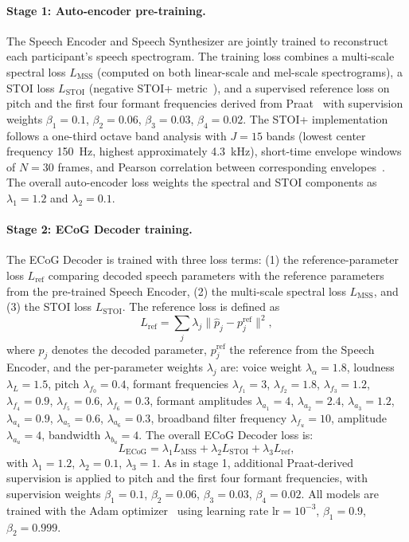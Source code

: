 \documentclass[10pt]{article}
\begin{document}
\paragraph{Stage 1: Auto-encoder pre-training.}
The Speech Encoder and Speech Synthesizer are jointly trained to reconstruct each participant's speech spectrogram. The training loss combines a multi-scale spectral loss $L_{\mathrm{MSS}}$ (computed on both linear-scale and mel-scale spectrograms), a STOI loss $L_{\mathrm{STOI}}$ (negative STOI+ metric~\cite{taal2011algorithm}), and a supervised reference loss on pitch and the first four formant frequencies derived from Praat~\cite{boersma2001praat} with supervision weights $\beta_1=0.1$, $\beta_2=0.06$, $\beta_3=0.03$, $\beta_4=0.02$. The STOI+ implementation follows a one-third octave band analysis with $J=15$ bands (lowest center frequency 150~Hz, highest approximately 4.3~kHz), short-time envelope windows of $N=30$ frames, and Pearson correlation between corresponding envelopes~\cite{relanoiborra2016sepsm}. The overall auto-encoder loss weights the spectral and STOI components as $\lambda_1=1.2$ and $\lambda_2=0.1$.

\paragraph{Stage 2: ECoG Decoder training.}
The ECoG Decoder is trained with three loss terms: (1) the reference-parameter loss $L_{\mathrm{ref}}$ comparing decoded speech parameters with the reference parameters from the pre-trained Speech Encoder, (2) the multi-scale spectral loss $L_{\mathrm{MSS}}$, and (3) the STOI loss $L_{\mathrm{STOI}}$. The reference loss is defined as
\begin{equation}
L_{\mathrm{ref}} = \sum_j \lambda_j \| \hat{p}_j - p_j^{\mathrm{ref}} \|^2,
\end{equation}
where $\hat{p}_j$ denotes the decoded parameter, $p_j^{\mathrm{ref}}$ the reference from the Speech Encoder, and the per-parameter weights $\lambda_j$ are: voice weight $\lambda_\alpha=1.8$, loudness $\lambda_L=1.5$, pitch $\lambda_{f_0}=0.4$, formant frequencies $\lambda_{f_1}=3$, $\lambda_{f_2}=1.8$, $\lambda_{f_3}=1.2$, $\lambda_{f_4}=0.9$, $\lambda_{f_5}=0.6$, $\lambda_{f_6}=0.3$, formant amplitudes $\lambda_{a_1}=4$, $\lambda_{a_2}=2.4$, $\lambda_{a_3}=1.2$, $\lambda_{a_4}=0.9$, $\lambda_{a_5}=0.6$, $\lambda_{a_6}=0.3$, broadband filter frequency $\lambda_{f_u}=10$, amplitude $\lambda_{a_u}=4$, bandwidth $\lambda_{b_u}=4$. The overall ECoG Decoder loss is:
\begin{equation}
L_{\mathrm{ECoG}} = \lambda_1 L_{\mathrm{MSS}} + \lambda_2 L_{\mathrm{STOI}} + \lambda_3 L_{\mathrm{ref}},
\end{equation}
with $\lambda_1=1.2$, $\lambda_2=0.1$, $\lambda_3=1$. As in stage 1, additional Praat-derived supervision is applied to pitch and the first four formant frequencies, with supervision weights $\beta_1=0.1$, $\beta_2=0.06$, $\beta_3=0.03$, $\beta_4=0.02$. All models are trained with the Adam optimizer~\cite{kingma2015adam} using learning rate $\mathrm{lr}=10^{-3}$, $\beta_1=0.9$, $\beta_2=0.999$.
\end{document}
